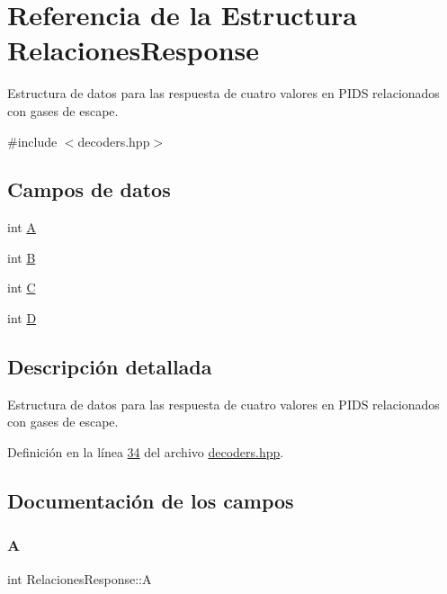 \hypertarget{structRelacionesResponse}{}\section{Referencia de la Estructura Relaciones\+Response}
\label{structRelacionesResponse}


Estructura de datos para las respuesta de cuatro valores en P\+I\+DS relacionados con gases de escape.  




{\ttfamily \#include $<$decoders.\+hpp$>$}

\subsection*{Campos de datos}
\begin{DoxyCompactItemize}
\item 
int \hyperlink{structRelacionesResponse_a560d1e6af01b999625b467ef3f858181}{A}
\item 
int \hyperlink{structRelacionesResponse_a1216f6019af393dd85853f352533ed9d}{B}
\item 
int \hyperlink{structRelacionesResponse_a37feda02f128b77f4f2d61cabcddc9e7}{C}
\item 
int \hyperlink{structRelacionesResponse_ab76f55b12df3754a9bb5b102a1c06cbc}{D}
\end{DoxyCompactItemize}


\subsection{Descripción detallada}
Estructura de datos para las respuesta de cuatro valores en P\+I\+DS relacionados con gases de escape. 

Definición en la línea \hyperlink{decoders_8hpp_source_l00034}{34} del archivo \hyperlink{decoders_8hpp_source}{decoders.\+hpp}.



\subsection{Documentación de los campos}
\mbox{\label{structRelacionesResponse_a560d1e6af01b999625b467ef3f858181}} 
\subsubsection{\texorpdfstring{A}{A}}
{\footnotesize\ttfamily int Relaciones\+Response\+::A}

